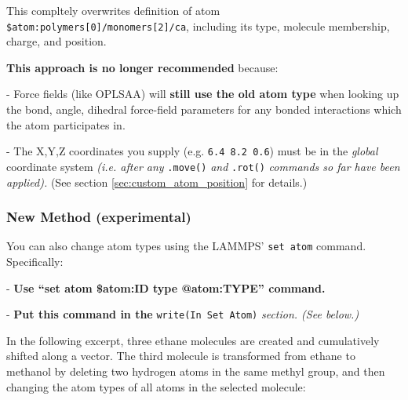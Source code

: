 \documentclass[11pt]{article}
\begin{document}
This compltely overwrites definition of atom \verb|$atom:polymers[0]/monomers[2]/ca|, including its type, molecule membership, charge, and position.

\textbf{This approach is no longer recommended} because:
\begin{list}{}
  \item - Force fields (like OPLSAA) will \textbf{still use the old atom type} when looking up the bond, angle, dihedral force-field parameters for any bonded interactions which the atom participates in.
  \item - The X,Y,Z coordinates you supply (e.g. \verb|6.4 8.2 0.6|)
    must be in the \textit{global} coordinate system
    \textit{(i.e. after any} \verb|.move()| \textit{and} \verb|.rot()| \textit{commands so far have been applied).}  (See section \ref{sec:custom_atom_position} for details.)
\end{list}

\subsubsection*{New Method (experimental)}

You can also change atom types using the LAMMPS' \verb|set atom| command. Specifically:
\begin{list}{}
\item - \textbf{Use ``set atom \$atom:ID type @atom:TYPE'' command.}
\item - \textbf{Put this command in the} \verb|write(In Set Atom)| \textit{section. (See below.)}
\end{list}

In the following excerpt, three ethane molecules are created and cumulatively shifted along a vector. The third molecule is transformed from ethane to methanol by deleting two hydrogen atoms in the same methyl group, and then changing the atom types of all atoms in the selected molecule:
\end{document}
